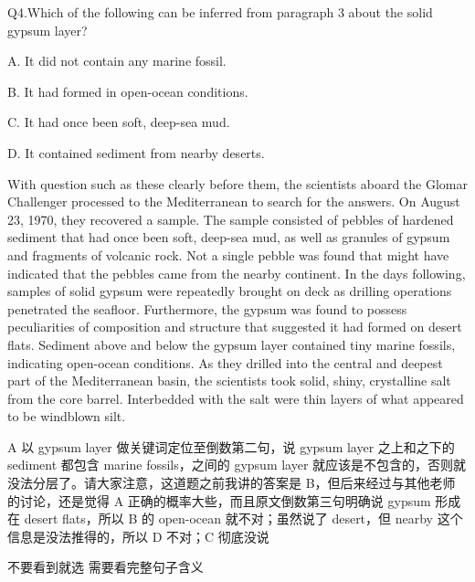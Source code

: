 \begin{blk}
    \begin{qst}
        Q4.Which of the following can be inferred from paragraph 3 about the solid gypsum layer?
    \end{qst}

    \begin{chc}
        A. It did not contain any marine fossil.

        B. It had formed in open-ocean conditions.

        C. It had once been soft, deep-sea mud.

        D. It contained sediment from nearby deserts.
    \end{chc}

    \begin{psgq}
        With question such as these clearly before them, the scientists aboard the Glomar Challenger processed to the Mediterranean to search for the answers. On August 23, 1970, they recovered a sample. The sample consisted of pebbles of hardened sediment that had once been soft, deep-sea mud, as well as granules of gypsum and fragments of volcanic rock. Not a single pebble was found that might have indicated that the pebbles came from the nearby continent. In the days following, samples of solid gypsum were repeatedly brought on deck as drilling operations penetrated the seafloor. Furthermore, the gypsum was found to possess peculiarities of composition and structure that suggested it had formed on desert flats. Sediment above and below the gypsum layer contained tiny marine fossils, indicating open-ocean conditions. As they drilled into the central and deepest part of the Mediterranean basin, the scientists took solid, shiny, crystalline salt from the core barrel. Interbedded with the salt were thin layers of what appeared to be windblown silt.
    \end{psgq}

    \begin{nlz}
        A 以 gypsum layer 做关键词定位至倒数第二句，说 gypsum layer 之上和之下的 sediment 都包含 marine fossils，之间的 gypsum layer 就应该是不包含的，否则就没法分层了。请大家注意，这道题之前我讲的答案是 B，但后来经过与其他老师的讨论，还是觉得 A 正确的概率大些，而且原文倒数第三句明确说 gypsum 形成在 desert flats，所以 B 的 open-ocean 就不对；虽然说了 desert，但 nearby 这个信息是没法推得的，所以 D 不对；C 彻底没说

        不要看到就选 需要看完整句子含义
    \end{nlz}
\end{blk}
